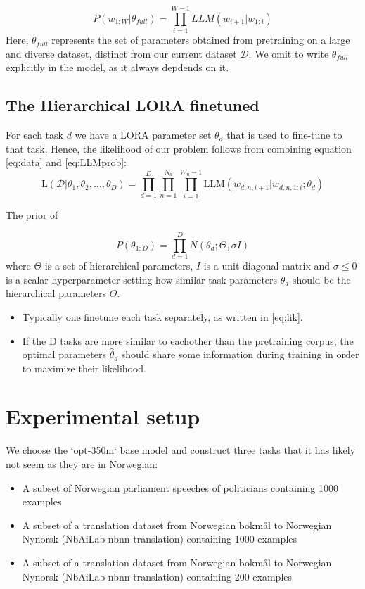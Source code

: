 \documentclass{article}
\begin{document}
\begin{equation} \label{eq:LLMprob}
P(w_{1:W} | \theta_{full}) = \prod_{i=1}^{W-1} LLM(w_{i+1} | w_{1:i})
\end{equation}
%
Here, $\theta_{full}$ represents the set of parameters obtained from pretraining on a large and diverse dataset, distinct from our current dataset $\mathcal{D}$.
We omit to write $\theta_{full}$ explicitly in the model, as it always depdends on it.

\subsection{The Hierarchical LORA finetuned}
For each task $d$ we have a LORA parameter set $\theta_d$ that is used to fine-tune to that task.
Hence, the likelihood of our problem follows from combining equation \ref{eq:data} and \ref{eq:LLMprob}:
\begin{equation} \label{eq:lik}
    \text{L}(\mathcal{D} | \theta_1, \theta_2, \ldots, \theta_D) = \prod_{d=1}^D \prod_{n=1}^{N_d} \prod_{i=1}^{W_n-1} \text{LLM}(w_{d,n,i+1} | w_{d,n,1:i}; \theta_d)
\end{equation}
%

The prior of 

\begin{equation}
    P(\theta_{1:D}) = \prod_{d=1}^D N(\theta_d ; \Theta, \sigma I)
\end{equation}
%
where $\Theta$ is a set of hierarchical parameters, $I$ is a unit diagonal matrix and $\sigma \leq 0$ is a scalar hyperparameter setting how similar task parameters $\theta_d$ should be the hierarchical parameters $\Theta$.

\begin{itemize}
    \item Typically one finetune each task separately, as written in \ref{eq:lik}.
    \item If the D tasks are more similar to eachother than the pretraining corpus, the optimal parameters $\hat{\theta}_d$ should share some information during training in order to maximize their likelihood.
\end{itemize}


\section{Experimental setup}
We choose the `opt-350m` base model and construct three tasks that it has likely not seem as they are in Norwegian:
\begin{itemize}
    \item A subset of Norwegian parliament speeches of politicians containing 1000 examples
    \item A subset of a translation dataset from Norwegian bokmål to Norwegian Nynorsk (NbAiLab-nbnn-translation) containing 1000 examples
    \item A subset of a translation dataset from Norwegian bokmål to Norwegian Nynorsk (NbAiLab-nbnn-translation) containing 200 examples
\end{itemize}
\end{document}
